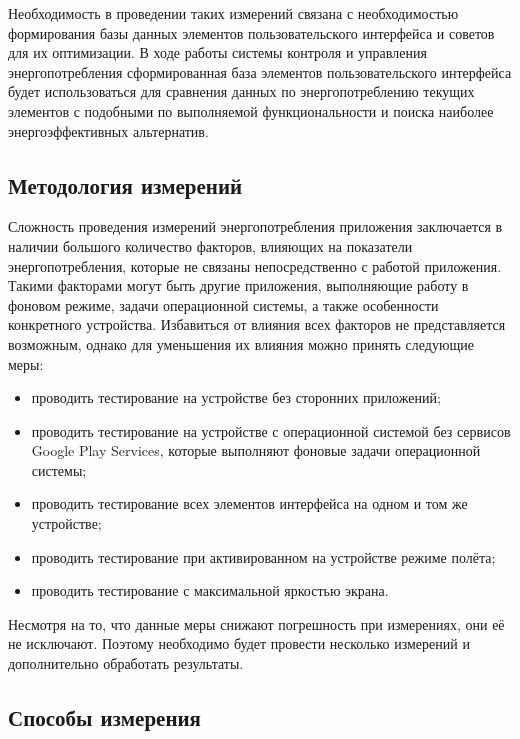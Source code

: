 \documentclass[a4paper,14pt]{extarticle} %
\begin{document}
	Необходимость в проведении таких измерений связана с необходимостью формирования базы данных элементов пользовательского интерфейса и советов для их оптимизации. В ходе работы системы контроля и управления энергопотребления сформированная база элементов пользовательского интерфейса будет использоваться для сравнения данных по энергопотреблению текущих элементов с подобными по выполняемой функциональности и поиска наиболее энергоэффективных альтернатив.
	
	\subsection{Методология измерений}
	
	Сложность проведения измерений энергопотребления приложения заключается в наличии большого количество факторов, влияющих на показатели энергопотребления, которые не связаны непосредственно с работой приложения. Такими факторами могут быть другие приложения, выполняющие работу в фоновом режиме, задачи операционной системы, а также особенности конкретного устройства. Избавиться от влияния всех факторов не представляется возможным, однако для уменьшения их влияния можно принять следующие меры:
	\begin{itemize}
		\item проводить тестирование на устройстве без сторонних приложений;
		\item проводить тестирование на устройстве с операционной системой без сервисов Google Play Services, которые выполняют фоновые задачи операционной системы;
		\item проводить тестирование всех элементов интерфейса на одном и том же устройстве;
		\item проводить тестирование при активированном на устройстве режиме полёта;
		\item проводить тестирование с максимальной яркостью экрана.
	\end{itemize}

	Несмотря на то, что данные меры снижают погрешность при измерениях, они её не исключают. Поэтому необходимо будет провести несколько измерений и дополнительно обработать результаты.
	
	\subsection{Способы измерения}
	
\end{document}
